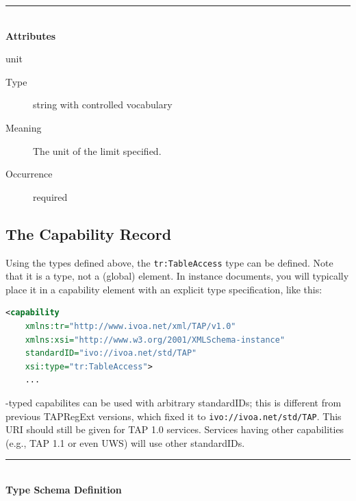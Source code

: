 \documentclass{ivoa}
\begin{document}
\noindent\rule[-2pt]{\textwidth}{0.5pt}\\
					\textbf{ Attributes}

\begin{bigdescription}
\item[unit]
\begin{description}
\item[Type\quad] string with controlled vocabulary
\item[Meaning\quad] 
            The unit of the limit specified.
            
\item[Occurrence\quad] required




\end{description}


\end{bigdescription}



\subsection{The Capability Record}

\label{caprec}

Using the types defined above, the 
\texttt{tr:TableAccess} type can be defined.  Note that
it is a type, not a (global) element.  In instance documents, you
will typically place it in a capability element with an explicit
type specification, like this:


\begin{lstlisting}[language=XML]
  <capability 
    xmlns:tr="http://www.ivoa.net/xml/TAP/v1.0" 
    xmlns:xsi="http://www.w3.org/2001/XMLSchema-instance" 
    standardID="ivo://ivoa.net/std/TAP" 
    xsi:type="tr:TableAccess">
    ...
\end{lstlisting}

-typed capabilites can be used with arbitrary
standardIDs; this is different from previous TAPRegExt versions, which
fixed it to \nolinkurl{ivo://ivoa.net/std/TAP}.  This URI should still
be given for TAP 1.0 services.  Services having other capabilities
(e.g., TAP 1.1 or even UWS) will use other standardIDs.

\noindent\rule[-2pt]{\textwidth}{0.5pt}\\
			\textbf{ Type Schema Definition}
\end{document}
